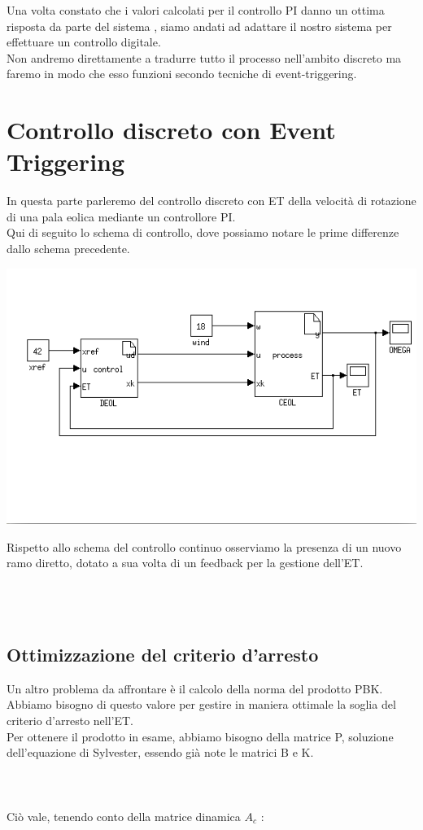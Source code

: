 \documentclass[a4paper,13pt]{article}
\begin{document}
Una volta constato che i valori calcolati per il controllo PI danno un ottima risposta 
da parte del sistema , siamo andati ad adattare il nostro sistema per effettuare un controllo digitale.\\
Non andremo direttamente a tradurre tutto il processo nell'ambito discreto ma faremo in modo che esso funzioni secondo tecniche di event-triggering.

\section{Controllo discreto con Event Triggering}

	In questa parte parleremo del controllo discreto con ET della velocità di rotazione di una pala eolica mediante un
	controllore PI.\\ Qui di seguito lo schema di controllo, dove possiamo notare le prime differenze dallo schema 				precedente.
	
\begin{center}
\includegraphics[scale=0.6]{eoltrig.png}
\end{center}

	Rispetto allo schema del controllo continuo osserviamo la presenza di un nuovo ramo diretto, dotato a sua volta di un
	feedback per la gestione dell'ET.\\ \\ \\ \\
	
\subsection{Ottimizzazione del criterio d'arresto}
	Un altro problema da affrontare è il calcolo della norma del prodotto PBK.
	Abbiamo bisogno di questo valore per gestire in maniera ottimale la soglia del criterio d'arresto nell'ET.\\
	Per ottenere il prodotto in esame, abbiamo bisogno della matrice P, soluzione dell'equazione di Sylvester, essendo già 	note le matrici B e K.\\ \\ \\ \\
	Ciò vale, tenendo conto della matrice dinamica $A_{c}$ :\\
	
\end{document}
